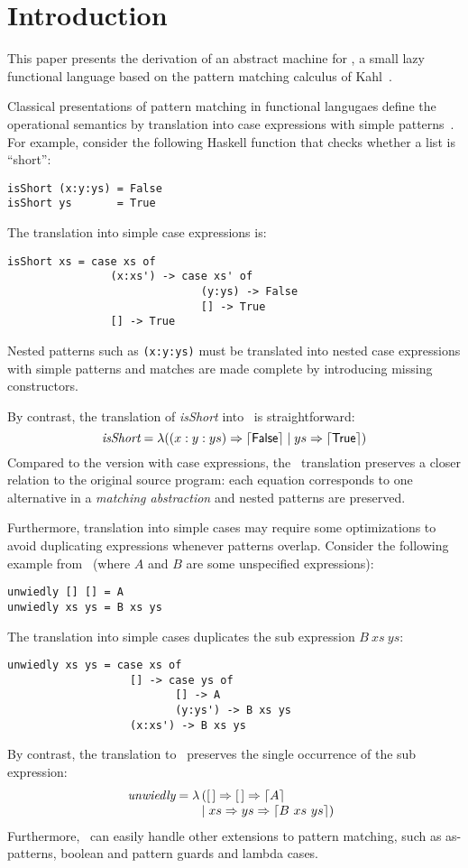 \section{Introduction}

This paper presents the derivation of an abstract machine for \lambdaPMC, a small
lazy functional language based on the pattern matching calculus
of Kahl~\cite{kahl_2004}.

Classical presentations of pattern matching in functional langugaes
define the operational semantics by translation
into case expressions with simple patterns~\cite{spj_1987,jones_1992}. For
example, consider the following Haskell function that checks whether a
list is ``short'':
\begin{verbatim}
isShort (x:y:ys) = False
isShort ys       = True
\end{verbatim}
The translation into simple case expressions is:
\begin{verbatim}
isShort xs = case xs of
                (x:xs') -> case xs' of
                              (y:ys) -> False
                              [] -> True
                [] -> True
\end{verbatim}
Nested patterns such as \verb|(x:y:ys)| must be translated into nested
case expressions with simple patterns and matches are made complete by
introducing missing constructors.  

By contrast, the translation of \textit{isShort} into \lambdaPMC\ is
straightforward:
\[ 
  \textit{isShort} = \lambda ((x:y:ys) \Rightarrow \left\lceil \textsf{False}\right\rceil \mid
  ys \Rightarrow \left\lceil \textsf{True}\right\rceil) 
\]
Compared to the version with case expressions, the \lambdaPMC\ translation
preserves a closer relation to the original source program: each
equation corresponds to one alternative in a \emph{matching
  abstraction} and nested patterns are preserved. 

Furthermore, translation into simple cases may require some
optimizations to avoid duplicating expressions whenever patterns
overlap. Consider the following example from~\cite{spj_1987} (where
$A$ and $B$ are some unspecified expressions):
\begin{verbatim}
unwiedly [] [] = A
unwiedly xs ys = B xs ys
\end{verbatim}
The translation into simple cases duplicates the sub expression $B~ xs~ ys$:
\begin{verbatim}
unwiedly xs ys = case xs of
                   [] -> case ys of
                          [] -> A
                          (y:ys') -> B xs ys
                   (x:xs') -> B xs ys
\end{verbatim}
By contrast, the translation to \lambdaPMC\ preserves the single occurrence of
the sub expression:
\[
  \textit{unwiedly} =
  \lambda\!\! \begin{array}[t]{l}
             ([\,] \Rightarrow [\,] \Rightarrow \left\lceil A\right\rceil \\
             \mid xs \Rightarrow ys \Rightarrow \left\lceil B~xs~ys\right\rceil)
             \end{array}
\]
Furthermore, \lambdaPMC\ can easily handle
other extensions to pattern matching, such as as-patterns, boolean and
pattern guards and lambda cases.

